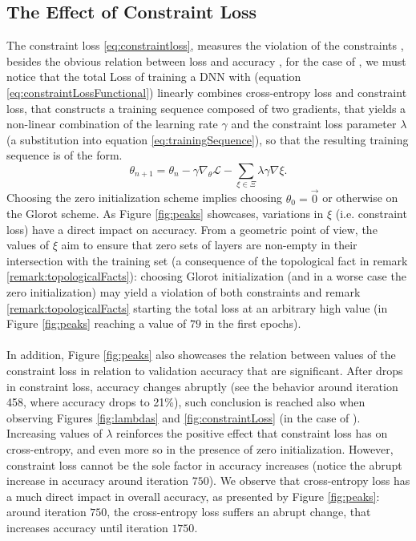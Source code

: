 \subsection{The Effect of Constraint Loss}\label{subsec:constraintLoss}
The constraint loss \ref{eq:constraintloss}, measures the  violation of the constraints \cite{florenzano2001ConvexAnalysis,Burges1998TutorialOnSVMForPatternRecognition}, besides the obvious relation between loss and accuracy \cite{LeCun06atutorial,lecun2015DeepLearningBig}, for the case of \SepUnit, we must notice that the total Loss of training a DNN with \SepUnit (equation \ref{eq:constraintLossFunctional}) linearly combines cross-entropy loss and constraint loss, that constructs a training sequence composed of two gradients, that yields a non-linear combination of the learning rate $\gamma$ and the constraint loss parameter $\lambda$ (a substitution into equation \ref{eq:trainingSequence}), so that the resulting training sequence is of the form.
\begin{equation}\label{eq:resultingConstraintLoss}
\theta_{n+1} = \theta_n - \gamma\nabla_{\theta}\mathcal{L}-\sum_{\xi\in\Xi}\lambda\gamma\nabla\xi.
\end{equation}
Choosing the zero initialization scheme implies choosing $\theta_0=\vec{0}$ or otherwise on the Glorot scheme. As Figure \ref{fig:peaks} showcases, variations in $\xi$ (i.e. constraint loss) have a direct impact on accuracy.  From a geometric point of view, the values of $\xi$ aim to ensure that zero sets of layers are non-empty in their intersection with the training set (a consequence of the topological fact in remark \ref{remark:topologicalFacts}): choosing Glorot initialization (and in a worse case the zero initialization) may yield a violation of both constraints and remark \ref{remark:topologicalFacts} starting the total loss at an arbitrary high value (in Figure \ref{fig:peaks} reaching a value of $79$ in the first epochs).     
\\\\
In addition, Figure \ref{fig:peaks} also showcases the relation between values of the constraint loss in relation to validation accuracy that are significant. After drops in constraint loss, accuracy changes abruptly (see the behavior around iteration 458, where accuracy drops to 21\%), such conclusion is reached also when observing Figures \ref{fig:lambdas} and \ref{fig:constraintLoss} (in the case of \cifar). Increasing values of $\lambda$ reinforces the positive effect that constraint loss has on cross-entropy, and even more so in the presence of zero initialization. However, constraint loss cannot be the sole factor in accuracy increases (notice the abrupt increase in accuracy around iteration $750$). We observe that cross-entropy loss has a much direct impact in overall accuracy, as presented by Figure \ref{fig:peaks}: around iteration $750$, the cross-entropy loss suffers an abrupt change, that increases accuracy until iteration $1750$.   
